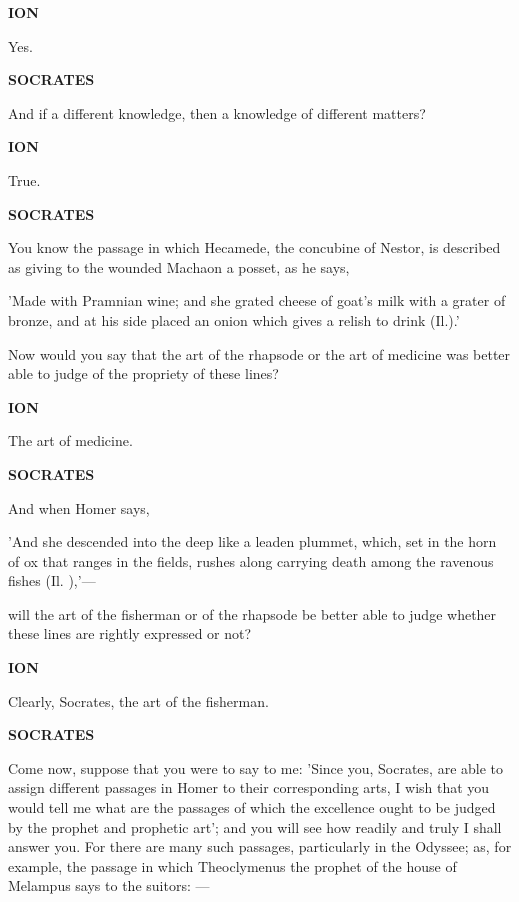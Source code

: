 \documentclass[11pt,letter]{article}
\begin{document}
\par \textbf{ION}
\par   Yes.

\par \textbf{SOCRATES}
\par   And if a different knowledge, then a knowledge of different matters?

\par \textbf{ION}
\par   True.

\par \textbf{SOCRATES}
\par   You know the passage in which Hecamede, the concubine of Nestor, is described as giving to the wounded Machaon a posset, as he says,

\par  'Made with Pramnian wine; and she grated cheese of goat's milk with a grater of bronze, and at his side placed an onion which gives a relish to drink (Il.).'

\par  Now would you say that the art of the rhapsode or the art of medicine was better able to judge of the propriety of these lines?

\par \textbf{ION}
\par   The art of medicine.

\par \textbf{SOCRATES}
\par   And when Homer says,

\par  'And she descended into the deep like a leaden plummet, which, set in the horn of ox that ranges in the fields, rushes along carrying death among the ravenous fishes (Il. ),'—

\par  will the art of the fisherman or of the rhapsode be better able to judge whether these lines are rightly expressed or not?

\par \textbf{ION}
\par   Clearly, Socrates, the art of the fisherman.

\par \textbf{SOCRATES}
\par   Come now, suppose that you were to say to me:  'Since you, Socrates, are able to assign different passages in Homer to their corresponding arts, I wish that you would tell me what are the passages of which the excellence ought to be judged by the prophet and prophetic art'; and you will see how readily and truly I shall answer you. For there are many such passages, particularly in the Odyssee; as, for example, the passage in which Theoclymenus the prophet of the house of Melampus says to the suitors: —
\end{document}
